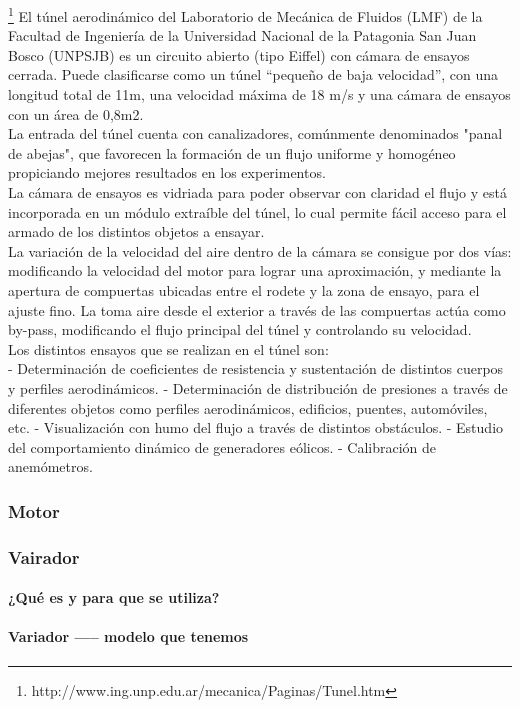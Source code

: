 \footnote{http://www.ing.unp.edu.ar/mecanica/Paginas/Tunel.htm} 
	El túnel aerodinámico del Laboratorio de Mecánica de Fluidos (LMF) de la Facultad de Ingeniería de la Universidad Nacional de la Patagonia San Juan Bosco (UNPSJB) es un circuito abierto (tipo Eiffel) con cámara de ensayos cerrada. Puede clasificarse como un túnel “pequeño de baja velocidad”, con una longitud total de 11m, una velocidad máxima de 18 m/s y una cámara de ensayos con un área de 0,8m2.
	\\
	La entrada del túnel cuenta con canalizadores, comúnmente denominados "panal de abejas", que favorecen la formación de un flujo uniforme y homogéneo propiciando mejores resultados en los experimentos.
	\\
	La cámara de ensayos es vidriada para poder observar con claridad el flujo y está incorporada en un módulo extraíble del túnel, lo cual permite fácil acceso para el armado de los distintos objetos a ensayar.
	\\
	La variación de la velocidad del aire dentro de la cámara se consigue por dos vías: modificando la velocidad del motor para lograr una aproximación, y mediante la apertura de compuertas ubicadas entre el rodete y la zona de ensayo, para el ajuste fino. La toma aire desde el exterior a través de las compuertas actúa como by-pass, modificando el flujo principal del túnel y controlando su velocidad.
	\\
	Los distintos ensayos que se realizan en el túnel son:
	\\
	- Determinación de coeficientes de resistencia y sustentación de distintos cuerpos y perfiles aerodinámicos.
	- Determinación de distribución de presiones a través de diferentes objetos como perfiles aerodinámicos, edificios, puentes, automóviles, etc.
	- Visualización con humo del flujo a través de distintos obstáculos.
	- Estudio del comportamiento dinámico de generadores eólicos.
	- Calibración de anemómetros. 

		\subsubsection{Motor}
		
		\subsubsection{Vairador}

		\paragraph{¿Qué es y para que se utiliza?}
		\paragraph{Variador ----- modelo que tenemos}

	